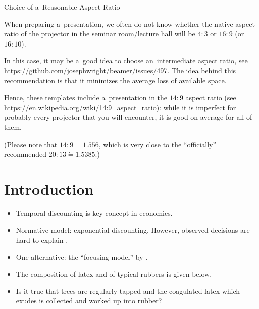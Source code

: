 

\begin{frame}{Choice of a~Reasonable Aspect Ratio}

	When preparing a~presentation, we often do not know whether the native aspect ratio of the projector in the seminar room/lecture hall will be $4 : 3$ or $16 : 9$ (or $16 : 10$).
	
	In this case, it may be a~good idea to choose an~\alert{intermediate aspect ratio}, see \url{https://github.com/josephwright/beamer/issues/497}. The idea behind this recommendation is that it minimizes the average loss of available space.
	
	Hence, these templates include a~presentation in the \alert{$14 : 9$ aspect ratio} (see \url{https://en.wikipedia.org/wiki/14:9_aspect_ratio}): while it is imperfect for probably every projector that you will encounter, it is good on average for all of them.
	
	(Please note that $14 : 9 \mathrel{\dot{=}} 1.556$, which is very close to the ``officially'' recommended $20 : 13 \mathrel{\dot{=}} 1.5385$.)
	
\end{frame}


\section{Introduction}


\begin{frame}{\titleprefix}

	\begin{itemize}
		\item Temporal discounting is key concept in economics.
		\item Normative model: exponential discounting. However, observed decisions are hard to explain \citep[e.g.,][]{Dohmen2012}.
		\item One alternative: the ``focusing model'' by \cite{Koszegi2013}.
	\end{itemize}
	
	\begin{itemize}
		\item The composition of latex and of typical rubbers is given below.
		\item Is it true that trees are regularly tapped and the coagulated latex which exudes is collected and worked up into rubber?
	\end{itemize}

\end{frame}


